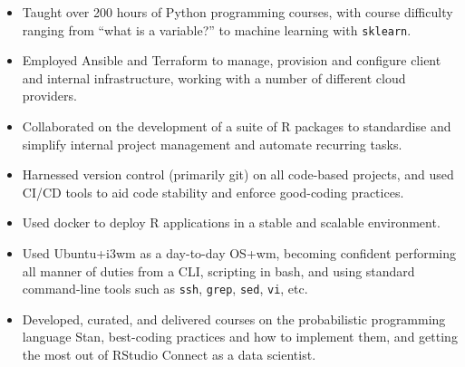 \documentclass[12pt, a4paper]{article}
\begin{document}
\begin{itemize}[
    itemsep=.05em,
    labelwidth=2em,
    leftmargin=1.25em,
    topsep=0em]

    \item[] 
                   {Taught over 200 hours of Python programming courses, with
                   course difficulty ranging from ``what is a variable?'' to
                   machine learning with \texttt{sklearn}.}%

    \item[] 
                   {Employed Ansible and Terraform to manage, provision and
                   configure client and internal infrastructure, working with a
                   number of different cloud providers.}%

    \item[] 
                   {Collaborated on the development of a suite of R packages to
                    standardise and simplify internal project management and
                    automate recurring tasks.}

    \item[] 
                   {Harnessed version control (primarily git) on all
                   code-based projects, and used CI/CD tools to aid code
                   stability and enforce good-coding practices.}%

    \item[] 
                   {Used docker to deploy R applications in a stable and
                   scalable environment.}%

    \item[] 
                   {Used Ubuntu+i3wm as a day-to-day OS+wm, becoming confident
                   performing all manner of duties from a CLI, scripting in
                   bash, and using standard command-line tools such as
                   \texttt{ssh}, \texttt{grep}, \texttt{sed}, \texttt{vi}, etc.}%

    \item[] 
                   {Developed, curated, and delivered courses on the
                   probabilistic programming language Stan, best-coding
                   practices and how to implement them, and getting the most
                   out of RStudio Connect as a data scientist.}%

\end{itemize}
\end{document}
